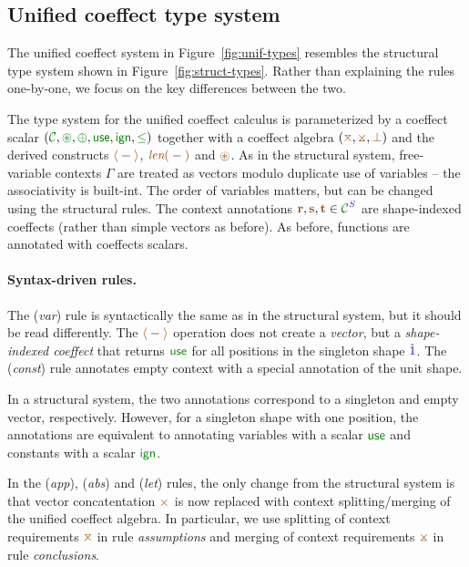\subsection{Unified coeffect type system}
\label{sec:unified-types}
The unified coeffect system in Figure~\ref{fig:unif-types} resembles the structural type system
shown in Figure~\ref{fig:struct-types}. Rather than explaining the rules one-by-one, we focus on
the key differences between the two.

The type system for the unified coeffect calculus is parameterized by a coeffect scalar 
$(\C, \cseq, \cpar, \cunit, \czero, \cleq)$ together with a coeffect algebra $(\azip, \apar, \azero)$ 
and the derived constructs $\alift{-}$, $\alen{-}$ and $\aseq$. 
As in the structural system, free-variable contexts $\Gamma$ are treated as vectors modulo duplicate
use of variables -- the associativity is built-int. The order of variables matters, but can be changed 
using the structural rules. The context annotations $\aclrd{\textbf{r}}, \aclrd{\textbf{s}}, \aclrd{\textbf{t}} \in \C^\SH$ 
are shape-indexed coeffects (rather than simple vectors as before). As before, functions are
annotated with coeffects scalars. %

\paragraph{Syntax-driven rules.} 
The (\emph{var}) rule is syntactically the same as in the structural system, but it should be read
differently. The $\alift{-}$ operation does not create a \emph{vector}, but a \emph{shape-indexed
coeffect} that returns $\cunit$ for all positions in the singleton shape $\sunit$. 
The (\emph{const}) rule annotates empty context with a special annotation of the unit shape.

In a structural system, the two annotations correspond to a singleton and empty vector, respectively.
However, for a singleton shape with one position, the annotations are equivalent to annotating
variables with a scalar $\cunit$ and constants with a scalar $\czero$.

In the (\emph{app}), (\emph{abs}) and (\emph{let}) rules, the only change from the structural
system is that vector concatentation $\atimes$ is now replaced with context splitting/merging 
of the unified coeffect algebra. In particular, we use splitting of context requirements $\azip$
in rule \emph{assumptions} and merging of context requirements $\apar$ in rule \emph{conclusions}.

